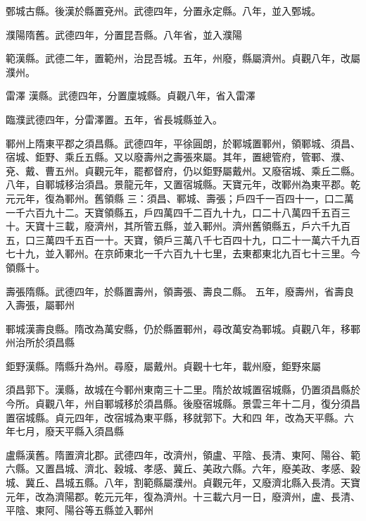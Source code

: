 \begin{pinyinscope}
 鄄城古縣。後漢於縣置兗州。武德四年，分置永定縣。八年，並入鄄城。



 濮陽隋舊。武德四年，分置昆吾縣。八年省，並入濮陽



 範漢縣。武德二年，置範州，治昆吾城。五年，州廢，縣屬濟州。貞觀八年，改屬濮州。



 雷澤
 漢縣。武德四年，分置廩城縣。貞觀八年，省入雷澤



 臨濮武德四年，分雷澤置。五年，省長城縣並入。



 鄆州上隋東平郡之須昌縣。武德四年，平徐圓朗，於鄆城置鄆州，領鄆城、須昌、宿城、鉅野、乘丘五縣。又以廢壽州之壽張來屬。其年，置總管府，管鄆、濮、兗、戴、曹五州。貞觀元年，罷都督府，仍以鉅野屬戴州。又廢宿城、乘丘二縣。八年，自鄆城移治須昌。景龍元年，又置宿城縣。天寶元年，改鄆州為東平郡。乾元元年，復為鄆州。舊領縣
 三：須昌、鄆城、壽張；戶四千一百四十一，口二萬一千六百九十二。天寶領縣五，戶四萬四千二百九十九，口二十八萬四千五百三十。天寶十三載，廢濟州，其所管五縣，並入鄆州。濟州舊領縣五，戶六千九百五，口三萬四千五百一十。天寶，領戶三萬八千七百四十九，口二十一萬六千九百七十九，並入鄆州。在京師東北一千六百九十七里，去東都東北九百七十三里。今領縣十。



 壽張隋縣。武德四年，於縣置壽州，領壽張、壽良二縣。
 五年，廢壽州，省壽良入壽張，屬鄆州



 鄆城漢壽良縣。隋改為萬安縣，仍於縣置鄆州，尋改萬安為鄆城。貞觀八年，移鄆州治所於須昌縣



 鉅野漢縣。隋縣升為州。尋廢，屬戴州。貞觀十七年，載州廢，鉅野來屬



 須昌郭下。漢縣，故城在今鄆州東南三十二里。隋於故城置宿城縣，仍置須昌縣於今所。貞觀八年，州自鄆城移於須昌縣。後廢宿城縣。景雲三年十二月，復分須昌置宿城縣。貞元四年，改宿城為東平縣，移就郭下。大和四
 年，改為天平縣。六年七月，廢天平縣入須昌縣



 盧縣漢舊。隋置濟北郡。武德四年，改濟州，領盧、平陰、長清、東阿、陽谷、範六縣。又置昌城、濟北、穀城、孝感、冀丘、美政六縣。六年，廢美政、孝感、穀城、冀丘、昌城五縣。八年，割範縣屬濮州。貞觀元年，又廢濟北縣入長清。天寶元年，改為濟陽郡。乾元元年，復為濟州。十三載六月一日，廢濟州，盧、長清、平陰、東阿、陽谷等五縣並入鄆州




\end{pinyinscope}

